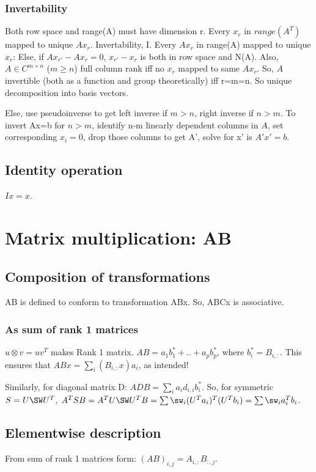 \documentclass[oneside, article]{memoir}
\begin{document}
\subsubsection{Invertability}
Both row space and range(A) must have dimension r. Every $x_{r}$ in $range(A^{T})$ mapped to unique $Ax_{r}$. Invertability, I. Every $Ax_{r}$ in range(A) mapped to unique $x_{r}$: Else, if $Ax_{r'} - Ax_{r}= 0$, $x_{r'} - x_{r}$ is both in row space and N(A). Also, $A \in C^{m \times n}$ ($m \geq n$) full column rank iff no $x_{r}$ mapped to same $Ax_{r}$. So, $A$ invertible (both as a function and group theoretically) iff r=m=n. So unique decomposition into basis vectors.

Else, use pseudoinverse to get left inverse if $m>n$, right inverse if $n>m$. To invert Ax=b for $n>m$, identify n-m linearly dependent columns in $A$, set corresponding $x_{i} = 0$, drop those columns to get A', solve for x' is $A'x' = b$.

\subsection{Identity operation}
$Ix = x$.

\section{Matrix multiplication: AB}
\subsection{Composition of transformations}
AB is defined to conform to transformation ABx. So, ABCx is associative.

\subsubsection{As sum of rank 1 matrices}
$u\otimes v = uv^{T}$ makes Rank 1 matrix. $AB = a_{1}b_{1}^{*} + .. + a_{p}b_{p}^{*}$, where $b_{i}^{*} = B_{i,:}$. This ensures that $ABx = \sum_i (B_{i,:}x) a_i$, as intended! 

Similarly, for diagonal matrix D: $ADB = \sum_{i} a_{i}d_{i,i}b_{i}^{*}$. So, for symmetric $S = U \SW U^{T}$, $A^{T}SB = A^{T}U\SW U^{T}B = \sum \sw_i (U^{T}a_i)^{T}(U^{T}b_i) = \sum \sw_i a_i^{T}b_i$.

\subsection{Elementwise description}
From sum of rank 1 matrices form: $(AB)_{i,j} = A_{i,:}B_{:,j}$.
\end{document}
